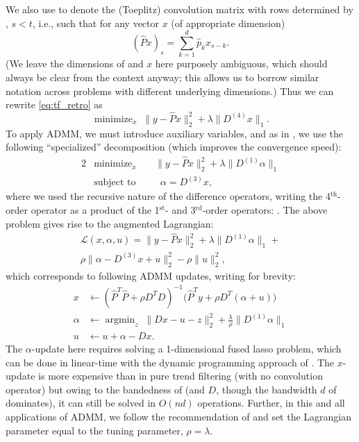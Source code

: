 \documentclass[sts]{imsart}
\def\cL{\mathcal{L}}
\newcommand{\argmin}{\mathop{\mathrm{argmin}}}
\newcommand{\minimize}{\mathop{\mathrm{minimize}}}
\newcommand{\subjectto}{\mathop{\mathrm{subject\,\,to}}}
\def\hp{\hat{p}}
\def\hP{\hat{P}}
\def\th{^\mathrm{th}}
\def\st{^\mathrm{st}}
\def\rd{^\mathrm{rd}}
\theoremstyle{plain}
\theoremstyle{definition}
\theoremstyle{remark}
\begin{document}
\begin{appendix}
We also use \smash{$\hP$} to denote the (Toeplitz) convolution matrix with rows
determined by \smash{$\hp_s$}, $s<t$, i.e., such that for any vector $x$ (of
appropriate dimension) 
$$
(\hP x)_s = \sum_{k=1}^d \hp_k x_{s-k}.
$$
(We leave the dimensions of \smash{$\hP$} and $x$ here purposely ambiguous,
which should always be clear from the context anyway; this allows us to borrow
similar notation across problems with different underlying dimensions.) Thus we
can rewrite \eqref{eq:tf_retro} as 
$$
\minimize_x \; \| y - \hP x \|_2^2 + \lambda \|D^{(4)} x\|_1. 
$$
To apply ADMM, we must introduce auxiliary variables, and as in
\citet{ramdas2016fast}, we use the following ``specialized'' decomposition 
(which improves the convergence speed):
\begin{alignat*}{2}
&\minimize_x \; && \| y - \hP x \|_2^2 + \lambda \|D^{(1)} \alpha\|_1 \\ 
&\subjectto && \;\; \alpha = D^{(3)} x,
\end{alignat*}
where we used the recursive nature of the difference operators, writing the
4$\th$-order operator as a product of the 1$\st$- and 3$\rd$-order operators: 
. The above problem gives rise to the
augmented Lagrangian: 
\begin{multline*}
\cL(x, \alpha, u) = \| y - \hP x \|_2^2 + \lambda \|D^{(1)} \alpha\|_1 +{} \\ 
\rho \|\alpha -  D^{(3)} x + u\|_2^2 -  \rho \|u\|_2^2, 
\end{multline*}
which corresponds to following ADMM updates, writing  for 
brevity:  
\begin{align*}
x &\leftarrow (\hP^T \hP + \rho D^T D)^{-1} \big( \hP^T y + \rho D^T
    (\alpha + u)\big) \\   
\alpha &\leftarrow \argmin_z \; \| D x  - u - z \|_2^2 +
\frac{\lambda}{\rho} \|D^{(1)} \alpha\|_1 \\
u & \leftarrow u + \alpha - D x.
\end{align*}
The $\alpha$-update here requires solving a 1-dimensional fused lasso problem, 
which can be done in linear-time with the dynamic programming approach of 
\citet{johnson2013dynamic}. The $x$-update is more expensive than in pure
trend filtering (with no convolution operator) but owing to the bandedness of
\smash{$\hP$} (and $D$, though the bandwidth $d$ of \smash{$\hP$} dominates), it
can still be solved in $O(nd)$ operations. Further, in this and all applications  
of ADMM, we follow the recommendation of \citet{ramdas2016fast} and set the
Lagrangian parameter equal to the tuning parameter, $\rho = \lambda$. 


\end{appendix}
\end{document}

